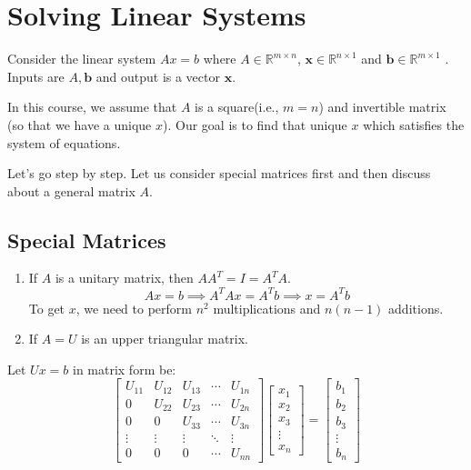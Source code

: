 \documentclass[
]{book}
\begin{document}
\hypertarget{solving-linear-systems}{%
\section{Solving Linear Systems}\label{solving-linear-systems}}

Consider the linear system \(Ax=b\) where \(A\in\mathbb{R}^{m\times n}\), \(\mathbf{x}\in\mathbb{R}^{n\times 1}\) and \(\mathbf{b}\in\mathbb{R}^{m\times 1}\) . Inputs are \(A, \mathbf{b}\) and output is a vector \(\mathbf{x}\).

In this course, we assume that \(A\) is a square(i.e., \(m=n\)) and invertible matrix (so that we have a unique \(x\)). Our goal is to find that unique \(x\) which satisfies the system of equations.

Let's go step by step. Let us consider special matrices first and then discuss about a general matrix \(A\).

\hypertarget{special-matrices}{%
\subsection{Special Matrices}\label{special-matrices}}

\begin{enumerate}
\def\labelenumi{\arabic{enumi}.}
\item
  If \(A\) is a unitary matrix, then \(AA^T = I=A^TA\).
  \[Ax=b \implies A^T Ax = A^Tb \implies x = A^T b\]
  To get \(x\), we need to perform \(n^2\) multiplications and \(n(n-1)\) additions.
\item
  If \(A=U\) is an upper triangular matrix.
\end{enumerate}

Let \(Ux=b\) in matrix form be:
\begin{equation}
\begin{bmatrix}
U_{11} & U_{12} & U_{13} & \cdots & U_{1n}\\
0      & U_{22} & U_{23} & \cdots & U_{2n}\\
0      & 0      & U_{33} & \cdots & U_{3n}\\
\vdots & \vdots & \vdots & \ddots & \vdots\\
0      & 0      & 0      & \cdots & U_{nn}
\end{bmatrix}
\begin{bmatrix} x_1 \\ x_2 \\x_3\\ \vdots\\ x_n\end{bmatrix}
=
\begin{bmatrix} b_1 \\ b_2 \\b_3\\ \vdots\\ b_n\end{bmatrix}
\end{equation}
\end{document}

